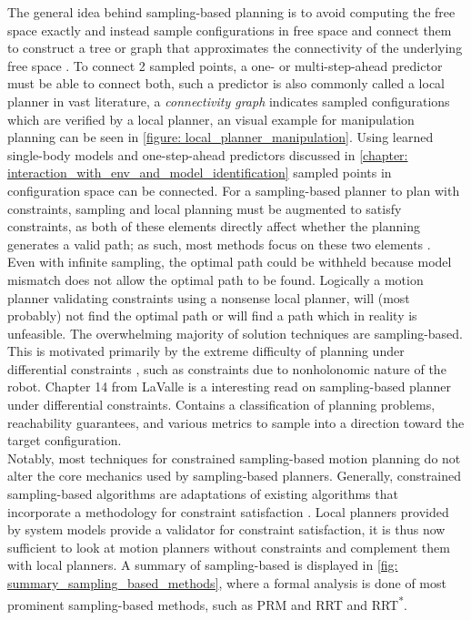 The general idea behind sampling-based planning is to avoid computing the free space exactly and instead sample configurations in free space and connect them to construct a tree or graph that approximates the connectivity of the underlying free space \cite{kingston_sampling-based_2018}. To connect 2 sampled points, a one- or multi-step-ahead predictor must be able to connect both, such a predictor is also commonly called a local planner in vast literature, a \textit{connectivity graph} indicates sampled configurations which are verified by a local planner, an visual example for manipulation planning can be seen in \cref{figure: local_planner_manipulation}. Using learned single-body models and one-step-ahead predictors discussed in \cref{chapter: interaction_with_env_and_model_identification} sampled points in configuration space can be connected. For a sampling-based planner to plan with constraints, sampling and local planning must be augmented to satisfy constraints, as both of these elements directly affect whether the planning generates a valid path; as such, most methods focus on these two elements \cite{kingston_sampling-based_2018}. \\

Even with infinite sampling, the optimal path could be withheld because model mismatch does not allow the optimal path to be found. Logically a motion planner validating constraints using a nonsense local planner, will (most probably) not find the optimal path or will find a path which in reality is unfeasible. The overwhelming majority of solution techniques are sampling-based. This is motivated primarily by the extreme difficulty of planning under differential
constraints \cite{lavalle_planning_2006}, such as constraints due to nonholonomic nature of the robot. Chapter 14 from LaValle \cite{lavalle_planning_2006} is a interesting read on sampling-based planner under differential constraints. Contains a classification of planning problems, reachability guarantees, and various metrics to sample into a direction toward the target configuration.\\

Notably, most techniques for constrained sampling-based motion planning do not alter the core mechanics used by sampling-based planners. Generally, constrained sampling-based algorithms are adaptations of existing algorithms that incorporate a methodology for constraint satisfaction \cite{kingston_sampling-based_2018}. Local planners provided by system models provide a validator for constraint satisfaction, it is thus now sufficient to look at motion planners without constraints and complement them with local planners. A summary of sampling-based is displayed in \cref{fig: summary_sampling_based_methods}, where a formal analysis is done of most prominent sampling-based methods, such as \ac{PRM} and \ac{RRT} and \ac{RRT}\textsuperscript{*}.

